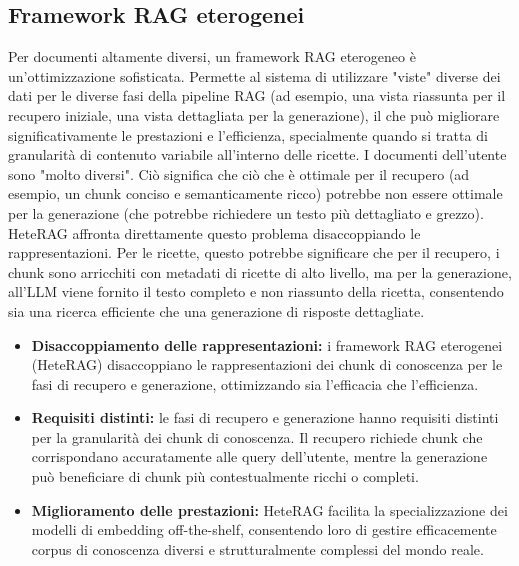 \documentclass[a4paper, 11pt]{article}
\begin{document}
\subsection{Framework RAG eterogenei}
Per documenti altamente diversi, un framework RAG eterogeneo è un'ottimizzazione sofisticata. Permette al sistema di utilizzare "viste" diverse dei dati per le diverse fasi della pipeline RAG (ad esempio, una vista riassunta per il recupero iniziale, una vista dettagliata per la generazione), il che può migliorare significativamente le prestazioni e l'efficienza, specialmente quando si tratta di granularità di contenuto variabile all'interno delle ricette. I documenti dell'utente sono "molto diversi". Ciò significa che ciò che è ottimale per il recupero (ad esempio, un chunk conciso e semanticamente ricco) potrebbe non essere ottimale per la generazione (che potrebbe richiedere un testo più dettagliato e grezzo). HeteRAG \cite{heterag} affronta direttamente questo problema disaccoppiando le rappresentazioni. Per le ricette, questo potrebbe significare che per il recupero, i chunk sono arricchiti con metadati di ricette di alto livello, ma per la generazione, all'LLM viene fornito il testo completo e non riassunto della ricetta, consentendo sia una ricerca efficiente che una generazione di risposte dettagliate.
\begin{itemize}
    \item \textbf{Disaccoppiamento delle rappresentazioni:} i framework RAG eterogenei (HeteRAG) disaccoppiano le rappresentazioni dei chunk di conoscenza per le fasi di recupero e generazione, ottimizzando sia l'efficacia che l'efficienza. \cite{heterag}
    \item \textbf{Requisiti distinti:} le fasi di recupero e generazione hanno requisiti distinti per la granularità dei chunk di conoscenza. Il recupero richiede chunk che corrispondano accuratamente alle query dell'utente, mentre la generazione può beneficiare di chunk più contestualmente ricchi o completi. \cite{heterag}
    \item \textbf{Miglioramento delle prestazioni:} HeteRAG facilita la specializzazione dei modelli di embedding off-the-shelf, consentendo loro di gestire efficacemente corpus di conoscenza diversi e strutturalmente complessi del mondo reale. \cite{heterag}
\end{itemize}
\end{document}
